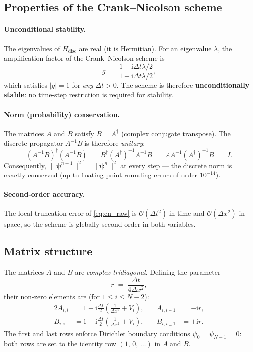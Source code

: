\documentclass[12pt, a4paper]{article}
\newcommand{\dt}{\Delta t}
\newcommand{\dx}{\Delta x}
\newcommand{\ii}{\mathrm{i}}          %
\newcommand{\CN}{Crank--Nicolson}
\begin{document}
\subsection{Properties of the Crank--Nicolson scheme}
\label{sec:cn_properties}

\paragraph{Unconditional stability.}
The eigenvalues of $H_\text{disc}$ are real (it is Hermitian).  For an
eigenvalue $\lambda$, the amplification factor of the \CN{} scheme is
\begin{equation}
  g \;=\; \frac{1 - \ii\dt\lambda/2}{1 + \ii\dt\lambda/2},
\end{equation}
which satisfies $|g| = 1$ for \emph{any} $\dt > 0$.  The scheme is
therefore \textbf{unconditionally stable}: no time-step restriction is
required for stability.

\paragraph{Norm (probability) conservation.}
The matrices $A$ and $B$ satisfy $B = A^\dagger$ (complex conjugate
transpose).  The discrete propagator $A^{-1}B$ is therefore
\emph{unitary}:
\begin{equation}
  (A^{-1}B)^\dagger (A^{-1}B)
  \;=\; B^\dagger (A^\dagger)^{-1} A^{-1} B
  \;=\; A A^{-1} (A^\dagger)^{-1} B
  \;=\; I.
\end{equation}
Consequently, $\|\boldsymbol{\psi}^{n+1}\|^2 = \|\boldsymbol{\psi}^n\|^2$
at every step — the discrete norm is exactly conserved (up to
floating-point rounding errors of order $10^{-14}$).

\paragraph{Second-order accuracy.}
The local truncation error of \eqref{eq:cn_raw} is $\mathcal{O}(\dt^2)$
in time and $\mathcal{O}(\dx^2)$ in space, so the scheme is globally
second-order in both variables.

\subsection{Matrix structure}

The matrices $A$ and $B$ are \emph{complex tridiagonal}.  Defining the
parameter
\begin{equation}
  r \;=\; \frac{\dt}{4\dx^2},
\end{equation}
their non-zero elements are (for $1 \leq i \leq N-2$):
\begin{alignat}{2}
  A_{i,i}   &= 1 + \ii\frac{\dt}{2}\!\left(\frac{1}{\dx^2} + V_i\right),
  &\quad A_{i,i\pm 1} &= -\ii r, \label{eq:A_elements}\\[4pt]
  B_{i,i}   &= 1 - \ii\frac{\dt}{2}\!\left(\frac{1}{\dx^2} + V_i\right),
  &\quad B_{i,i\pm 1} &= +\ii r. \label{eq:B_elements}
\end{alignat}
The first and last rows enforce Dirichlet boundary conditions
$\psi_0 = \psi_{N-1} = 0$: both rows are set to the identity row
$(1,\,0,\,\ldots)$ in $A$ and $B$.
\end{document}
